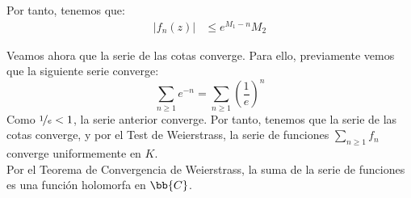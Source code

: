 \documentclass[12pt]{article}
\begin{document}
\begin{ejercicio}[2.5 puntos]
\begin{enumerate}
            Por tanto, tenemos que:
            \begin{align*}
                |f_n(z)| &\leq e^{M_1 - n} M_2
            \end{align*}

            Veamos ahora que la serie de las cotas converge. Para ello, previamente vemos que la siguiente serie converge:
            \begin{equation*}
                \sum_{n\geq 1} e^{-n} = \sum_{n\geq 1} \left(\frac{1}{e}\right)^n
            \end{equation*}
            Como $\nicefrac{1}{e} < 1$, la serie anterior converge. Por tanto, tenemos que la serie de las cotas converge, y por el Test de Weierstrass, la serie de funciones $\sum\limits_{n\geq 1} f_n$ converge uniformemente en $K$.\\

            Por el Teorema de Convergencia de Weierstrass, la suma de la serie de funciones es una función holomorfa en $\bb{C}$.
        \end{enumerate}
    \end{ejercicio}
\end{document}
